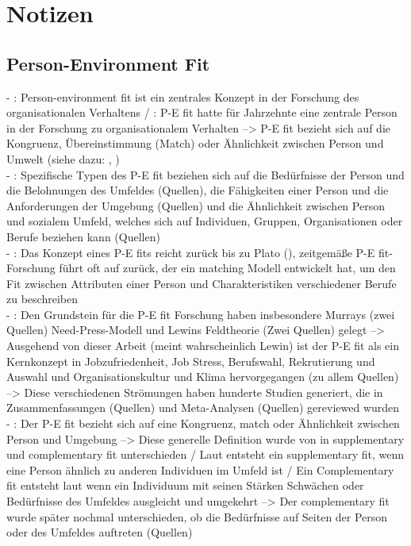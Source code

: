 \chapter{Notizen}
\label{ch:notizen}

\section{Person-Environment Fit}
\label{ch:notizen:personEnvironmentFit}
- \cite[S. 1]{edwards:2008}: Person-environment fit ist ein zentrales Konzept in der Forschung des organisationalen Verhaltens / \cite[S. 2]{edwards:2008}: P-E fit hatte für Jahrzehnte eine zentrale Person in der Forschung zu organisationalem Verhalten --> P-E fit bezieht sich auf die Kongruenz, Übereinstimmung (Match) oder Ähnlichkeit zwischen Person und Umwelt (siehe dazu: \cite{edwards:1998}, \cite{muchinsky:1987})\\
- \cite[S. 2]{edwards:2008}: Spezifische Typen des P-E fit beziehen sich auf die Bedürfnisse der Person und die Belohnungen des Umfeldes (Quellen), die Fähigkeiten einer Person und die Anforderungen der Umgebung (Quellen) und die Ähnlichkeit zwischen Person und sozialem Umfeld, welches sich auf Individuen, Gruppen, Organisationen oder Berufe beziehen kann (Quellen) \\
- \cite[S. 2]{edwards:2008}: Das Konzept eines P-E fits reicht zurück bis zu Plato (\cite{dumont:1995}), zeitgemäße P-E fit-Forschung führt oft auf \textcite{parsons:1909} zurück, der ein matching Modell entwickelt hat, um den Fit zwischen Attributen einer Person und Charakteristiken verschiedener Berufe zu beschreiben \\
- \cite[S. 2]{edwards:2008}: Den Grundstein für die P-E fit Forschung haben insbesondere Murrays (zwei Quellen) Need-Press-Modell und Lewins Feldtheorie (Zwei Quellen) gelegt --> Ausgehend von dieser Arbeit (meint wahrscheinlich Lewin) ist der P-E fit als ein Kernkonzept in Jobzufriedenheit, Job Stress, Berufswahl, Rekrutierung und Auswahl und Organisationskultur und Klima hervorgegangen (zu allem Quellen) --> Diese verschiedenen Strömungen haben hunderte Studien generiert, die in Zusammenfassungen (Quellen) und Meta-Analysen (Quellen) gereviewed wurden \\
- \cite[S. 4]{edwards:2008}: Der P-E fit bezieht sich auf eine Kongruenz, match oder Ähnlichkeit zwischen Person und Umgebung --> Diese generelle Definition wurde von \textcite{muchinsky:1987} in supplementary und complementary fit unterschieden / Laut \cite[S. 269]{muchinsky:1987} entsteht ein supplementary fit, wenn eine Person ähnlich zu anderen Individuen im Umfeld ist / Ein Complementary fit entsteht laut \cite[S. 271]{muchinsky:1987} wenn ein Individuum mit seinen Stärken Schwächen oder Bedürfnisse des Umfeldes ausgleicht und umgekehrt --> Der complementary fit wurde später nochmal unterschieden, ob die Bedürfnisse auf Seiten der Person oder des Umfeldes auftreten (Quellen) \\
